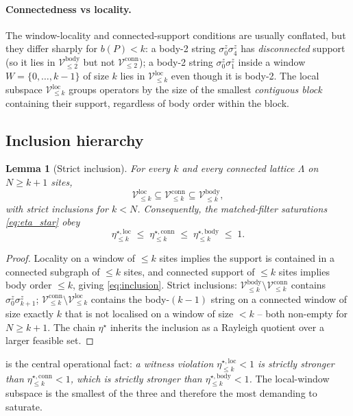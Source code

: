 \documentclass[11pt,a4paper]{article}
\newcommand{\Vbody}[1]{\mathcal{V}^{\mathrm{body}}_{\le #1}}
\newcommand{\Vconn}[1]{\mathcal{V}^{\mathrm{conn}}_{\le #1}}
\newcommand{\Vloc}[1]{\mathcal{V}^{\mathrm{loc}}_{\le #1}}
\newcommand{\etabody}[1]{\eta^{\star,\mathrm{body}}_{\le #1}}
\newcommand{\etaconn}[1]{\eta^{\star,\mathrm{conn}}_{\le #1}}
\newcommand{\etaloc}[1]{\eta^{\star,\mathrm{loc}}_{\le #1}}
\newtheorem{lemma}{Lemma}
\begin{document}
\paragraph{Connectedness vs locality.}  The window-locality and
connected-support conditions are usually conflated, but they
differ sharply for $b(P)<k$: a body-2 string $\sigma^z_0\sigma^z_4$
has \emph{disconnected} support (so it lies in $\Vbody{2}$ but
not $\Vconn{2}$); a body-2 string $\sigma^z_0\sigma^z_1$ inside a
window $W=\{0,\dots,k-1\}$ of size $k$ lies in $\Vloc{k}$ even
though it is body-2.  The local subspace $\Vloc{k}$ groups
operators by the size of the smallest \emph{contiguous block}
containing their support, regardless of body order within the
block.

\subsection{Inclusion hierarchy}

\begin{lemma}[Strict inclusion]
\label{lem:inclusions}
For every $k$ and every connected lattice $\Lambda$ on $N\ge k+1$
sites,
\begin{equation}
   \Vloc{k}\subseteq\Vconn{k}\subseteq\Vbody{k},
   \label{eq:inclusion}
\end{equation}
with strict inclusions for $k<N$.  Consequently, the matched-filter
saturations \eqref{eq:eta_star} obey
\begin{equation}
   \etaloc{k}\;\le\;\etaconn{k}\;\le\;\etabody{k}\;\le\;1.
   \label{eq:eta_hierarchy}
\end{equation}
\end{lemma}
\begin{proof}
Locality on a window of $\le k$ sites implies the support is
contained in a connected subgraph of $\le k$ sites, and connected
support of $\le k$ sites implies body order $\le k$, giving
\eqref{eq:inclusion}.  Strict inclusions: $\Vbody{k}\setminus\Vconn{k}$
contains $\sigma^z_0\sigma^z_{k+1}$; $\Vconn{k}\setminus\Vloc{k}$
contains the body-$(k-1)$ string on a connected window of size
exactly $k$ that is not localised on a window of size $<k$ -- both
non-empty for $N\ge k+1$.  The chain $\eta^\star$ inherits the
inclusion as a Rayleigh quotient over a larger feasible set.
\end{proof}

 is the central operational fact: \emph{a
witness violation $\etaloc{k}<1$ is strictly stronger than
$\etaconn{k}<1$, which is strictly stronger than
$\etabody{k}<1$.}  The local-window subspace is the smallest of
the three and therefore the most demanding to saturate.
\end{document}
